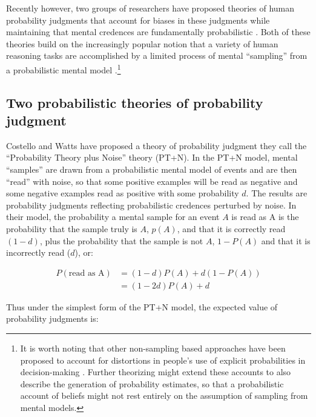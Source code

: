 \documentclass[
  man,floatsintext]{apa6}
\begin{document}
Recently however, two groups of researchers have proposed theories of human probability judgments that account for biases in these judgments while maintaining that mental credences are fundamentally probabilistic \autocite{costello.watts2014,zhu.etal2020}. Both of these theories build on the increasingly popular notion that a variety of human reasoning tasks are accomplished by a limited process of mental ``sampling'' from a probabilistic mental model \autocites[see also][]{chater.etal2020,dasgupta.etal2017}.\footnote{It is worth noting that other non-sampling based approaches have been proposed to account for distortions in people's use of explicit probabilities in decision-making \autocites[e.g.][]{zhang.maloney2012,zhang.etal2020}. Further theorizing might extend these accounts to also describe the generation of probability estimates, so that a probabilistic account of beliefs might not rest entirely on the assumption of sampling from mental models.}

\hypertarget{two-probabilistic-theories-of-probability-judgment}{%
\subsection{Two probabilistic theories of probability judgment}\label{two-probabilistic-theories-of-probability-judgment}}

Costello and Watts \autocite*{costello.watts2014,costello.watts2016,costello.watts2018} have proposed a theory of probability judgment they call the ``Probability Theory plus Noise'' theory (PT+N). In the PT+N model, mental ``samples'' are drawn from a probabilistic mental model of events and are then ``read'' with noise, so that some positive examples will be read as negative and some negative examples read as positive with some probability \(d\). The results are probability judgments reflecting probabilistic credences perturbed by noise. In their model, the probability a mental sample for an event \(A\) is read as A is the probability that the sample truly is \(A\), \(p(A)\), and that it is correctly read \((1-d)\), plus the probability that the sample is not \(A\), \(1-P(A)\) and that it is incorrectly read (\(d\)), or:

\begin{align*}
  P(\text{read as A}) &= (1-d)P(A) + d(1-P(A)) \\
  &= (1-2d)P(A) + d
\end{align*}

Thus under the simplest form of the PT+N model, the expected value of probability judgments is:
\end{document}
